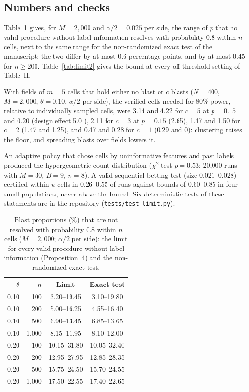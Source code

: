 \documentclass[journal]{IEEEtran}
\begin{document}
\subsection{Numbers and checks}
Table~\ref{tab:limit1} gives, for $M=2{,}000$ and $\alpha/2=0.025$ per side, the range of $p$ that no valid procedure without label information resolves with probability 0.8 within $n$ cells, next to the same range for the non-randomized exact test of the manuscript; the two differ by at most 0.6 percentage points, and by at most 0.45 for $n\ge200$. Table~\ref{tab:limit2} gives the bound at every off-threshold setting of Table~II.

With fields of $m=5$ cells that hold either no blast or $c$ blasts ($N=400$, $M=2{,}000$, $\theta=0.10$, $\alpha/2$ per side), the verified cells needed for 80\% power, relative to individually sampled cells, were 3.14 and 4.22 for $c=5$ at $p=0.15$ and $0.20$ (design effect 5.0 \cite{kish1965}), 2.11 for $c=3$ at $p=0.15$ (2.65), 1.47 and 1.50 for $c=2$ (1.47 and 1.25), and 0.47 and 0.28 for $c=1$ (0.29 and 0): clustering raises the floor, and spreading blasts over fields lowers it.

An adaptive policy that chose cells by uninformative features and past labels produced the hypergeometric count distribution ($\chi^2$ test $p=0.53$; 20,000 runs with $M=30$, $B=9$, $n=8$). A valid sequential betting test (size 0.021--0.028) certified within $n$ cells in 0.26--0.55 of runs against bounds of 0.60--0.85 in four small populations, never above the bound. Six deterministic tests of these statements are in the repository (\texttt{tests/test\_limit.py}).

\begin{table}[t]
\centering\footnotesize
\caption{Blast proportions (\%) that are not resolved with probability 0.8 within $n$ cells ($M=2{,}000$; $\alpha/2$ per side): the limit for every valid procedure without label information (Proposition~4) and the non-randomized exact test.}\label{tab:limit1}
\begin{tabular}{@{}rrcc@{}}
\toprule
$\theta$ & $n$ & Limit & Exact test\\
\midrule
0.10 & 100 & 3.20--19.45 & 3.10--19.80\\
0.10 & 200 & 5.00--16.25 & 4.55--16.40\\
0.10 & 500 & 6.90--13.45 & 6.85--13.65\\
0.10 & 1{,}000 & 8.15--11.95 & 8.10--12.00\\
0.20 & 100 & 10.15--31.80 & 10.05--32.40\\
0.20 & 200 & 12.95--27.95 & 12.85--28.35\\
0.20 & 500 & 15.75--24.50 & 15.70--24.55\\
0.20 & 1{,}000 & 17.50--22.55 & 17.40--22.65\\
\bottomrule
\end{tabular}
\end{table}
\end{document}
